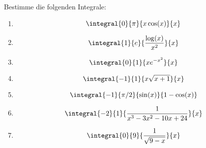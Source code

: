\begin{prob}
Bestimme die folgenden Integrale:
\begin{enumerate}[label=(\alph*)]
\item $$\integral{0}{\pi}{x\cos(x)}{x}$$
\item $$\integral{1}{e}{\frac{\log(x)}{x^2}}{x}$$
\item $$\integral{0}{1}{xe^{-x^2}}{x}$$
\item $$\integral{-1}{1}{x\sqrt{x+1}}{x}$$
\item $$\integral{-1}{\pi/2}{\sin(x)}{1-\cos(x)}$$
\item $$\integral{-2}{1}{\frac{1}{x^3-3x^2-10x+24}}{x}$$
\item $$\integral{0}{9}{\frac{1}{\sqrt{9-x}}}{x}$$
\end{enumerate}
\end{prob}
